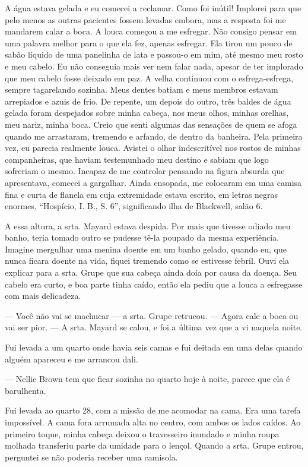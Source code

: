 A
água estava gelada e eu comecei a reclamar. Como foi inútil! Implorei para
que pelo menos as outras pacientes fossem levadas embora, mas a resposta
foi me mandarem calar a boca. A louca começou a me esfregar. Não consigo
pensar em uma palavra melhor para o que ela fez, apenas esfregar. Ela
tirou um pouco de sabão líquido de uma panelinha de lata e passou-o em
mim, até mesmo meu rosto e meu cabelo. Eu não conseguia mais ver nem
falar nada, apesar de ter implorado que meu cabelo fosse deixado em paz.
A velha continuou com o esfrega-esfrega, sempre tagarelando sozinha.
Meus dentes batiam e meus membros estavam arrepiados e azuis de frio. De
repente, um depois do outro, três baldes de água gelada foram despejados
sobre minha cabeça, nos meus olhos, minhas orelhas, meu nariz, minha
boca. Creio que senti algumas das sensações de quem se afoga quando me
arrastaram, tremendo e arfando, de dentro da banheira. Pela primeira
vez, eu parecia realmente louca. Avistei o olhar indescritível nos
rostos de minhas companheiras, que haviam testemunhado meu destino e
sabiam que logo sofreriam o mesmo. Incapaz de me controlar pensando na
figura absurda que apresentava, comecei a gargalhar. Ainda ensopada, me
colocaram em uma camisa fina e curta de flanela em cuja extremidade
estava escrito, em letras negras enormes, ``Hospício, I. B., S. 6'',
significando ilha de Blackwell, salão 6.

A essa altura, a srta. Mayard estava despida. Por mais que tivesse
odiado meu banho, teria tomado outro se pudesse tê-la poupado da mesma
experiência. Imagine mergulhar uma menina doente em um banho gelado,
quando eu, que nunca ficara doente na vida, fiquei tremendo como se
estivesse febril. Ouvi ela explicar para a srta. Grupe que sua cabeça
ainda doía por causa da doença. Seu cabelo era curto, e boa parte tinha
caído, então ela pediu que a louca a esfregasse com mais delicadeza.

--- Você não vai se machucar --- a srta. Grupe retrucou. --- Agora cale
a boca ou vai ser pior. --- A srta. Mayard se calou, e foi a última vez
que a vi naquela noite.

Fui levada a um quarto onde havia seis camas e fui deitada em uma delas
quando alguém apareceu e me arrancou dali.

--- Nellie Brown tem que ficar sozinha no quarto hoje à noite, parece
que ela é barulhenta.

Fui levada ao quarto 28, com a missão de me acomodar na cama. Era uma
tarefa impossível. A cama fora arrumada alta no centro, com ambos os
lados caídos. Ao primeiro toque, minha cabeça deixou o travesseiro
inundado e minha roupa molhada transferiu parte da umidade para o
lençol. Quando a srta. Grupe entrou, perguntei se não poderia receber
uma camisola.

